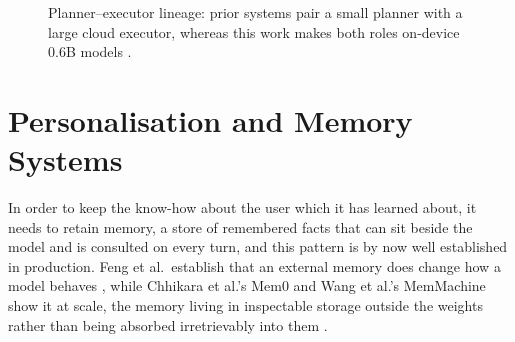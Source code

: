 \begin{figure}[t]
  \centering
  \caption{Planner--executor lineage: prior systems \cite{wei2025reactplannercentricframeworkcomplex, molinari2025reasonplanreactreasonerplannersupervisingreact} pair a small planner with a large cloud executor, whereas this work makes both roles on-device 0.6B models \cite{zywot2026smallagentscollaboratebeat}.}
  \label{fig:planner-executor-lineage}
\end{figure}

\section{Personalisation and Memory Systems}
\label{sec:sota-personalisation}

In order to keep the know-how about the user which it has learned about, it needs to retain memory, a store of remembered facts that can sit beside the model and is consulted on every turn, and this pattern is by now well established in production. Feng et al.\ establish that an external memory does change how a model behaves \cite{feng2026doespersonalizedmemoryshape}, while Chhikara et al.'s Mem0 and Wang et al.'s MemMachine show it at scale, the memory living in inspectable storage outside the weights rather than being absorbed irretrievably into them \cite{chhikara2025mem0buildingproductionreadyai, wang2026memmachinegroundtruthpreservingmemorypersonalized}.

